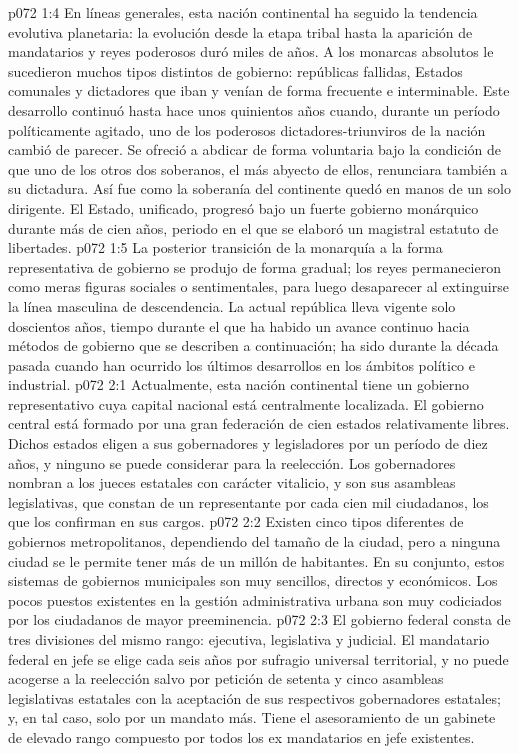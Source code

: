 \vs p072 1:4 \pc En líneas generales, esta nación continental ha seguido la tendencia evolutiva planetaria: la evolución desde la etapa tribal hasta la aparición de mandatarios y reyes poderosos duró miles de años. A los monarcas absolutos le sucedieron muchos tipos distintos de gobierno: repúblicas fallidas, Estados comunales y dictadores que iban y venían de forma frecuente e interminable. Este desarrollo continuó hasta hace unos quinientos años cuando, durante un período políticamente agitado, uno de los poderosos dictadores\hyp{}triunviros de la nación cambió de parecer. Se ofreció a abdicar de forma voluntaria bajo la condición de que uno de los otros dos soberanos, el más abyecto de ellos, renunciara también a su dictadura. Así fue como la soberanía del continente quedó en manos de un solo dirigente. El Estado, unificado, progresó bajo un fuerte gobierno monárquico durante más de cien años, periodo en el que se elaboró un magistral estatuto de libertades.
\vs p072 1:5 La posterior transición de la monarquía a la forma representativa de gobierno se produjo de forma gradual; los reyes permanecieron como meras figuras sociales o sentimentales, para luego desaparecer al extinguirse la línea masculina de descendencia. La actual república lleva vigente solo doscientos años, tiempo durante el que ha habido un avance continuo hacia métodos de gobierno que se describen a continuación; ha sido durante la década pasada cuando han ocurrido los últimos desarrollos en los ámbitos político e industrial.
\vs p072 2:1 Actualmente, esta nación continental tiene un gobierno representativo cuya capital nacional está centralmente localizada. El gobierno central está formado por una gran federación de cien estados relativamente libres. Dichos estados eligen a sus gobernadores y legisladores por un período de diez años, y ninguno se puede considerar para la reelección. Los gobernadores nombran a los jueces estatales con carácter vitalicio, y son sus asambleas legislativas, que constan de un representante por cada cien mil ciudadanos, los que los confirman en sus cargos.
\vs p072 2:2 Existen cinco tipos diferentes de gobiernos metropolitanos, dependiendo del tamaño de la ciudad, pero a ninguna ciudad se le permite tener más de un millón de habitantes. En su conjunto, estos sistemas de gobiernos municipales son muy sencillos, directos y económicos. Los pocos puestos existentes en la gestión administrativa urbana son muy codiciados por los ciudadanos de mayor preeminencia.
\vs p072 2:3 El gobierno federal consta de tres divisiones del mismo rango: ejecutiva, legislativa y judicial. El mandatario federal en jefe se elige cada seis años por sufragio universal territorial, y no puede acogerse a la reelección salvo por petición de setenta y cinco asambleas legislativas estatales con la aceptación de sus respectivos gobernadores estatales; y, en tal caso, solo por un mandato más. Tiene el asesoramiento de un gabinete de elevado rango compuesto por todos los ex mandatarios en jefe existentes.
